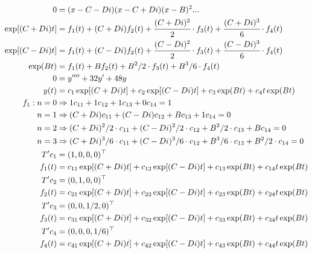 \documentclass[12pt,a4paper]{article}
\begin{document}
\begin{align}
0 &= (x - C - Di)(x - C + Di)(x - B)^2 ... \\
\exp [(C + Di)t] &= f_1(t) + (C + Di) f_2(t) + \cfrac{(C + Di)^2}{2}\cdot f_3(t) + \cfrac{(C + Di)^3}{6}\cdot f_4(t) \\
\exp [(C - Di)t] &= f_1(t) + (C - Di) f_2(t) + \cfrac{(C - Di)^2}{2}\cdot f_3(t) + \cfrac{(C - Di)^3}{6}\cdot f_4(t) \\
\exp (Bt) &= f_1(t) + B f_2(t) + B^2/2\cdot f_3(t) + B^3/6\cdot f_4(t) \\
0 &= y'''' + 32y' + 48y \\
y(t) &= c_1 \exp[(C + Di)t] + c_2 \exp[(C - Di)t] + c_3 \exp(Bt) + c_4 t \exp (Bt) \\
f_1: n = 0 &\Rightarrow 1 c_{11} + 1 c_{12} + 1 c_{13} + 0 c_{14} = 1 \\
n = 1 &\Rightarrow (C + Di) c_{11} + (C - Di) c_{12} + B c_{13} + 1 c_{14} = 0  \\
n = 2 &\Rightarrow (C + Di)^2/2\cdot c_{11} + (C - Di)^2/2\cdot c_{12} + B^2/2\cdot c_{13} + B c_{14} = 0 \\
n = 3 &\Rightarrow (C + Di)^3/6\cdot c_{11} + (C - Di)^3/6\cdot c_{12} + B^3/6\cdot c_{13} + B^2/2\cdot c_{14} = 0 \\
T' c_1 &= (1,0,0,0)^\top \\
f_1(t) &= c_{11} \exp[(C + Di)t] + c_{12} \exp[(C - Di)t] + c_{13} \exp(Bt) + c_{14} t \exp (Bt) \\
T' c_2 &= (0,1,0,0)^\top \\
f_2(t) &= c_{21} \exp[(C + Di)t] + c_{22} \exp[(C - Di)t] + c_{23} \exp(Bt) + c_{24} t \exp (Bt) \\
T' c_3 &= (0,0,1/2,0)^\top \\
f_3(t) &= c_{31} \exp[(C + Di)t] + c_{32} \exp[(C - Di)t] + c_{33} \exp(Bt) + c_{34} t \exp (Bt) \\
T' c_4 &= (0,0,0,1/6)^\top \\
f_4(t) &= c_{41} \exp[(C + Di)t] + c_{42} \exp[(C - Di)t] + c_{43} \exp(Bt) + c_{44} t \exp (Bt)
\end{align}
\end{document}
